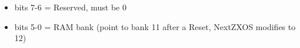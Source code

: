 \begin{itemize}
\item bits 7-6 = Reserved, must be 0
\item bits 5-0 = RAM bank (point to bank 11 after a Reset, NextZXOS
  modifies to 12)
\end{itemize}

